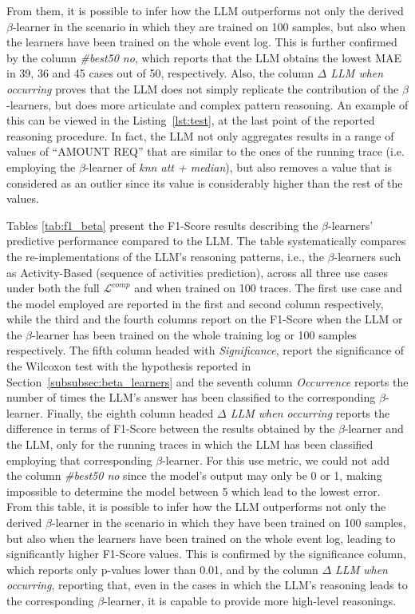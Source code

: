 \documentclass[manuscript,screen,review]{acmart}
\newcommand{\ML}{\mathcal{L}}
\begin{document}
From them, it is possible to infer how the LLM outperforms not only the derived $\beta$-learner in the scenario in which they are trained on 100 samples, but also when the learners have been trained on the whole event log. This is further confirmed by the column \textit{\#best50 no}, which reports that the LLM obtains the lowest MAE in 39, 36 and 45 cases out of 50, respectively. Also, the column \textit{$\Delta$ LLM when occurring} proves that the LLM does not simply replicate the contribution of the $\beta$-learners, but does more articulate and complex pattern reasoning. An example of this can be viewed in the Listing~\ref{lst:test}, at the last point of the reported reasoning procedure. In fact, the LLM not only aggregates results in a range of values of “AMOUNT REQ” that are similar to the ones of the running trace (i.e. employing the $\beta$-learner of \textit{knn att + median}), but also removes a value that is considered as an outlier since its value is considerably higher than the rest of the values.


Tables \ref{tab:f1_beta} present the F1-Score results describing the $\beta$-learners’ predictive performance compared to the LLM. The table systematically compares the re-implementations of the LLM’s reasoning patterns, i.e., the $\beta$-learners such as Activity-Based (sequence of activities prediction), across all three use cases under both the full $\ML^{comp}$ and when trained on 100 traces. The first use case and the model employed are reported in the first and second column respectively, while the third and the fourth columns report on the F1-Score when the LLM or the $\beta$-learner has been trained on the whole training log or 100 samples respectively. The fifth column headed with \textit{Significance}, report the significance of the Wilcoxon test with the hypothesis reported in Section~\ref{subsubsec:beta_learners} and the seventh column \textit{Occurrence} reports the number of times the LLM's answer has been classified to the corresponding $\beta$-learner. Finally, the eighth column headed \textit{$\Delta$ LLM when occurring} reports the difference in terms of F1-Score between the results obtained by the $\beta$-learner and the LLM, only for the running traces in which the LLM has been classified employing that corresponding $\beta$-learner. For this use metric, we could not add the column \textit{\#best50 no} since the model's output may only be 0 or 1, making impossible to determine the model between 5 which lead to the lowest error. 
From this table, it is possible to infer how the LLM outperforms not only the derived $\beta$-learner in the scenario in which they have been trained on 100 samples, but also when the learners have been trained on the whole event log, leading to significantly higher F1-Score values. This is confirmed by the significance column, which reports only p-values lower than 0.01, and by the column \textit{$\Delta$ LLM when occurring}, reporting that, even in the cases in which the LLM's reasoning leads to the corresponding $\beta$-learner, it is capable to provide more high-level reasonings.
\end{document}
